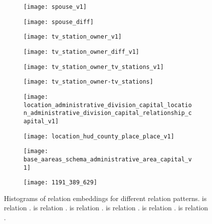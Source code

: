 \documentclass[11pt,a4paper]{article}
\begin{document}
\begin{figure*}[!h]
  \begin{subfigure}{.23\textwidth}
    \centering
    \texttt{[image: spouse\_v1]}
    \caption{}
    \label{fig:embedding:a}
  \end{subfigure}
  \begin{subfigure}{.23\textwidth}
    \centering
    \texttt{[image: spouse\_diff]}
    \caption{}
    \label{fig:embedding:b}
   \end{subfigure}
   \begin{subfigure}{.23\textwidth}
    \centering
    \texttt{[image: tv\_station\_owner\_v1]}
    \caption{}
    \label{fig:embedding:c}
  \end{subfigure}
  \begin{subfigure}{.23\textwidth}
    \centering
    \texttt{[image: tv\_station\_owner\_diff\_v1]}
    \caption{}
    \label{fig:embedding:d}
  \end{subfigure}
  
   \begin{subfigure}{.23\textwidth}
    \centering
    \texttt{[image: tv\_station\_owner\_tv\_stations\_v1]}
    \caption{}
    \label{fig:embedding:e}
  \end{subfigure}
    \begin{subfigure}{.23\textwidth}
    \centering
    \texttt{[image: tv\_station\_owner-tv\_stations]}
    \caption{}
    \label{fig:embedding:f}
  \end{subfigure}
  \begin{subfigure}{.23\textwidth}
    \centering
    \texttt{[image: location\_administrative\_division\_capital\_location\_administrative\_division\_capital\_relationship\_capital\_v1]}
    \caption{}
    \label{fig:embedding:g}
  \end{subfigure}
  \begin{subfigure}{.23\textwidth}
    \centering
    \texttt{[image: location\_hud\_county\_place\_place\_v1]}
    \caption{}
    \label{fig:embedding:h}
   \end{subfigure}
   
    \begin{subfigure}{.23\textwidth}
    \centering
    \texttt{[image: base\_aareas\_schema\_administrative\_area\_capital\_v1]}
    \caption{}
    \label{fig:embedding:i}
  \end{subfigure}
  \hspace{75mm}
    \begin{subfigure}{.23\textwidth}
    \centering
    \texttt{[image: 1191\_389\_629]}
    \caption{\scriptsize}
    \label{fig:embedding:j}
  \end{subfigure}
\caption{Histograms of relation embeddings for different relation patterns.  is relation .
 is relation .  is relation .
 is relation .
 is relation .  is relation .}
\label{fig:symm}
\end{figure*}
\end{document}

